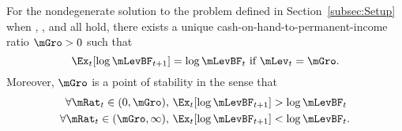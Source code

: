   \begin{theorem}\label{thm:TheoremGroIsStable}
    For the nondegenerate solution to the problem defined in Section~\ref{subsec:Setup} when {\FVAC}, {\WRIC}, and {\GICLog} all hold, there exists a unique cash-on-hand-to-permanent-income ratio $\mGro>0$ such that
    \begin{equation}
      \Ex_t [\log {\mLevBF}_{t+1} ] = \log \mLevBF_t \mbox{~if~} \mLev_t = \mGro.
      \label{eq:mTarget}
    \end{equation}
    Moreover, $\mGro$ is a point of stability in the sense that
    \begin{equation} \label{eq:stability}
      \begin{split}
        \forall {\mRat}_t\in(0,\mGro),      \,\,& \Ex_t [\log {\mLevBF}_{t+1}] > \log {\mLevBF}_t  \\
        \forall {\mRat}_t\in(\mGro,\infty), \,\,& \Ex_t [\log {\mLevBF}_{t+1}] < \log {\mLevBF}_t.
      \end{split}
    \end{equation}
  \end{theorem}
